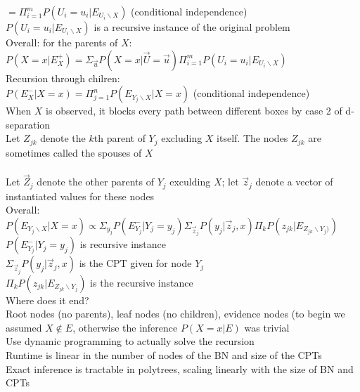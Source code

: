\documentclass[10pt,letterpaper,unboxed,cm]{article}
\begin{document}
$ = \Pi^m_{i=1}P(U_i = u_i|E_{U_i\backslash X})$ (conditional independence)\\
$P(U_i = u_i|E_{U_i\backslash X})$ is a recursive instance of the original problem\\
Overall: for the parents of $X$: $P(X=x|E_X^+) = \Sigma_{\overrightarrow{u}}P(X=x|\overrightarrow{U} = \overrightarrow{u})\Pi^m_{i=1}P(U_i = u_i|E_{U_i\backslash X})$\\
Recursion through chilren: \\
$P(E_X^-|X=x) = \Pi^n_{j=1}P(E_{Y_j\backslash X}|X=x)$ (conditional independence)\\
When $X$ is observed, it blocks every path between different boxes by case 2 of d-separation\\
Let $Z_{jk}$ denote the $k$th parent of $Y_j$ excluding $X$ itself. The nodes $Z_{jk}$ are sometimes called the spouses of $X$\\\\
Let $\overrightarrow{Z}_j$ denote the other parents of $Y_j$ exculding $X$; let $\overrightarrow{z}_j$ denote a vector of instantiated values for these nodes\\
Overall: $P(E_{Y_j \backslash X}|X=x) \propto \Sigma_{y_j} P(E_{Y_j}^-|Y_j = y_j)\Sigma_{\overrightarrow{z}_j} P(y_j|\overrightarrow{z}_j , x) \Pi_k P(z_{jk}|E_{Z_{jk} \backslash Y_j)})$\\
$P(E_{Y_j}^-|Y_j = y_j)$ is recursive instance\\
$\Sigma_{\overrightarrow{z}_j} P(y_j|\overrightarrow{z}_j , x)$ is the CPT given for node $Y_j$\\
$\Pi_k P(z_{jk}|E_{Z_{jk} \backslash Y_j})$ is the recursive instance\\
Where does it end?\\
Root nodes (no parents), leaf nodes (no children), evidence nodes (to begin we assumed $X \notin E$, otherwise the inference $P(X=x|E)$ was trivial\\
Use dynamic programming to actually solve the recursion\\
Runtime is linear in the number of nodes of the BN and size of the CPTs\\
Exact inference is tractable in polytrees, scaling linearly with the size of BN and CPTs\\
\end{document}
